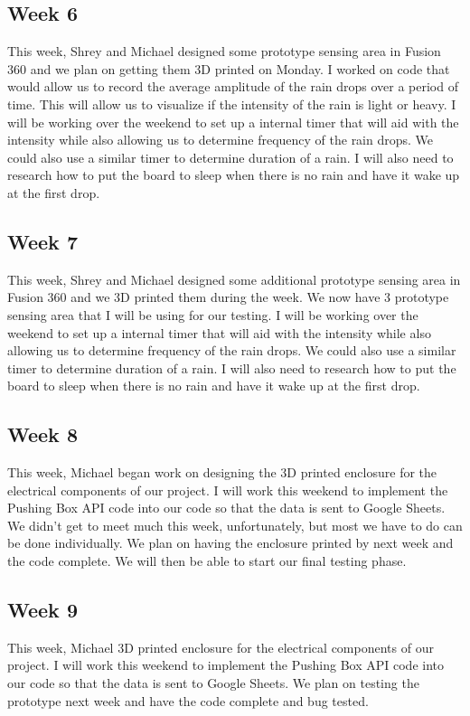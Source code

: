 \documentclass[letterpaper,10pt,draftclsnofoot,onecolumn]{article}
\begin{document}
\subsection{Week 6}
This week, Shrey and Michael designed some prototype sensing area in Fusion 360 and we plan on getting them 3D printed on Monday. I worked on code that would allow us to record the average amplitude of the rain drops over a period of time. This will allow us to visualize if the intensity of the rain is light or heavy. I will be working over the weekend to set up a internal timer that will aid with the intensity while also allowing us to determine frequency of the rain drops. We could also use a similar timer to determine duration of a rain. I will also need to research how to put the board to sleep when there is no rain and have it wake up at the first drop.
\subsection{Week 7}
This week, Shrey and Michael designed some additional prototype sensing area in Fusion 360 and we 3D printed them during the week. We now have 3 prototype sensing area that I will be using for our testing. I will be working over the weekend to set up a internal timer that will aid with the intensity while also allowing us to determine frequency of the rain drops. We could also use a similar timer to determine duration of a rain. I will also need to research how to put the board to sleep when there is no rain and have it wake up at the first drop.
 
\subsection{Week 8}
This week, Michael began work on designing the 3D printed enclosure for the electrical components of our project. I will work this weekend to implement the Pushing Box API code into our code so that the data is sent to Google Sheets. We didn't get to meet much this week, unfortunately, but most we have to do can be done individually. We plan on having the enclosure printed by next week and the code complete. We will then be able to start our final testing phase.

\subsection{Week 9}

This week, Michael 3D printed enclosure for the electrical components of our project. I will work this weekend to implement the Pushing Box API code into our code so that the data is sent to Google Sheets. We plan on testing the prototype next week and have the code complete and bug tested.
\end{document}
